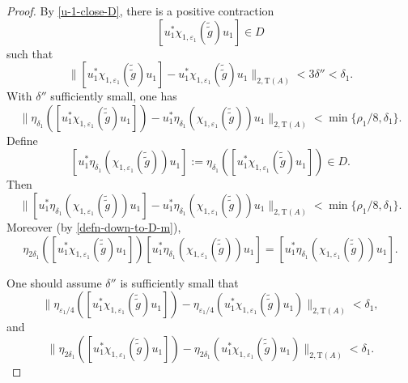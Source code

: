 \documentclass[12pt, oneside, psamsfonts]{amsart}
\theoremstyle{definition}
\theoremstyle{remark}
\numberwithin{equation}{section}
\newcommand{\norm}[1]{\| #1\|}
\newcommand{\eps}{\varepsilon}
\newcommand{\tr}{\mathrm{T}}
\begin{document}
\begin{proof}
By \eqref{u-1-close-D}, there is a positive contraction
$$ [u^*_1\chi_{1, \eps_1}(\tilde{\tilde{g}}) u_1] \in D $$
such that
\begin{equation}\label{down-to-D-1}
 \norm{ [u^*_1\chi_{1, \eps_1}(\tilde{\tilde{g}}) u_1] - u^*_1\chi_{1, \eps_1}(\tilde{\tilde{g}}) u_1 }_{2, \tr(A)} < 3\delta''<\delta_1. 
\end{equation}
With $\delta''$ sufficiently small, one has
$$\norm{ \eta_{\delta_1}([u^*_1\chi_{1, \eps_1}(\tilde{\tilde{g}}) u_1]) - u^*_1\eta_{\delta_1}(\chi_{1, \eps_1}(\tilde{\tilde{g}})) u_1 }_{2, \tr(A)} < \min\{\rho_1/8, \delta_1 \}.$$
Define
\begin{equation}\label{defn-down-to-D-m}
[u^*_1\eta_{\delta_1}(\chi_{1, \eps_1}(\tilde{\tilde{g}})) u_1] := \eta_{\delta_1}([u^*_1\chi_{1, \eps_1}(\tilde{\tilde{g}}) u_1]) \in D.
\end{equation}
Then
\begin{equation}\label{down-to-D-2}
 \norm{ [u^*_1\eta_{\delta_1}(\chi_{1, \eps_1}(\tilde{\tilde{g}})) u_1] - u^*_1\eta_{\delta_1}(\chi_{1, \eps_1}(\tilde{\tilde{g}})) u_1 }_{2, \tr(A)} < \min\{ \rho_1/8, \delta_1\}.
 \end{equation}
 Moreover (by \eqref{defn-down-to-D-m}), 
 \begin{equation}\label{down-to-D-3}
 \eta_{2\delta_1}([u^*_1\chi_{1, \eps_1}(\tilde{\tilde{g}}) u_1]) [u^*_1\eta_{\delta_1}(\chi_{1, \eps_1}(\tilde{\tilde{g}})) u_1]  = [u^*_1\eta_{\delta_1}(\chi_{1, \eps_1}(\tilde{\tilde{g}})) u_1]. 
 \end{equation}
 
 One should assume $\delta''$ is sufficiently small  that
 \begin{equation}\label{down-to-D-4} 
 \norm{ \eta_{\eps_1/4}([u_1^*\chi_{1, \eps_1}(\tilde{\tilde{g}})u_1]) - \eta_{\eps_1/4}(u_1^*\chi_{1, \eps_1}(\tilde{\tilde{g}})u_1) }_{2, \tr(A)} < \delta_1,
 \end{equation}
and
 \begin{equation}\label{down-to-D-5} 
 \norm{ \eta_{2\delta_1}([u_1^*\chi_{1, \eps_1}(\tilde{\tilde{g}})u_1]) - \eta_{2\delta_1}(u_1^*\chi_{1, \eps_1}(\tilde{\tilde{g}})u_1) }_{2, \tr(A)} < \delta_1. 
 \end{equation}
 

\end{proof}
\end{document}
